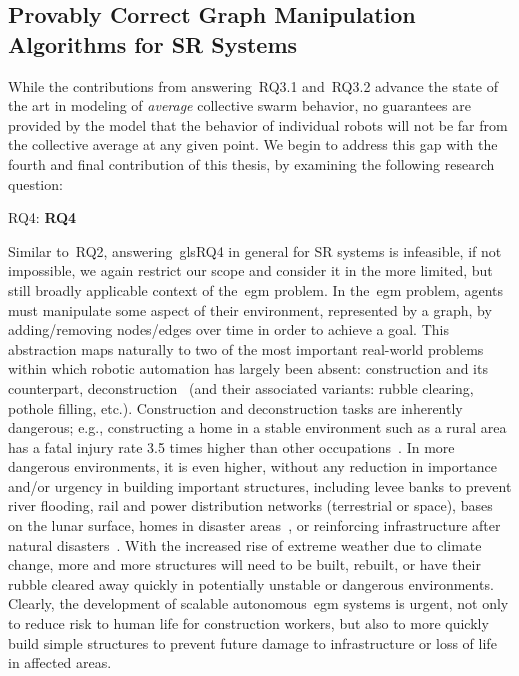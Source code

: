 \subsection{Provably Correct Graph Manipulation Algorithms for SR Systems}

While the contributions from answering~\gls{RQ3.1} and~\gls{RQ3.2} advance the
state of the art in modeling of \emph{average} collective swarm behavior, no
guarantees are provided by the model that the behavior of individual robots will
not be far from the collective average at any given point. We begin to address
this gap with the fourth and final contribution of this thesis, by examining the
following research question:

\medskip\noindent
\gls{RQ4}: \textbf{\Glsdesc{RQ4}}
\medskip

\noindent
Similar to~\gls{RQ2}, answering~gls{RQ4} in general for SR systems is
infeasible, if not impossible, we again restrict our scope and consider it in
the more limited, but still broadly applicable context of the~\gls{egm}
problem. In the~\gls{egm} problem, agents must manipulate some aspect of their
environment, represented by a graph, by adding/removing nodes/edges over time in
order to achieve a goal. This abstraction maps naturally to two of the most
important real-world problems within which robotic automation has largely been
absent: construction and its counterpart, deconstruction~\cite{Werfel2006} (and
their associated variants: rubble clearing, pothole filling, etc.). Construction
and deconstruction tasks are inherently dangerous; e.g., constructing a home in
a stable environment such as a rural area has a fatal injury rate 3.5 times
higher than other occupations~\cite{Napp2012}. In more dangerous environments,
it is even higher, without any reduction in importance and/or urgency in
building important structures, including levee banks to prevent river flooding,
rail and power distribution networks (terrestrial or space), bases on the lunar
surface, homes in disaster areas~\cite{Zhang2011,Allwright2014,Grushin2006}, or
reinforcing infrastructure after natural disasters~\cite{Magnenat2012}.  With
the increased rise of extreme weather due to climate change, more and more
structures will need to be built, rebuilt, or have their rubble cleared away
quickly in potentially unstable or dangerous environments. Clearly, the
development of scalable autonomous~\gls{egm} systems is urgent, not only to
reduce risk to human life for construction workers, but also to more quickly
build simple structures to prevent future damage to infrastructure or loss of
life in affected areas.

